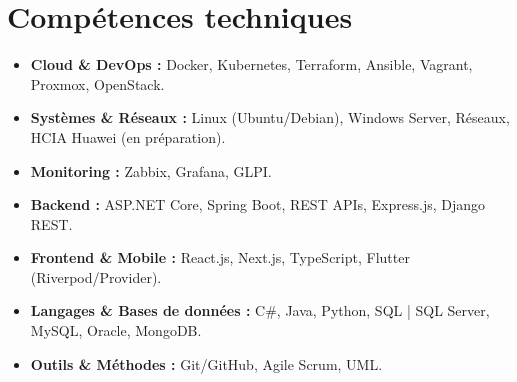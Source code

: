 \section{Compétences techniques}
    \vspace{0.2em}
    \begin{itemize}[label=\textbullet,left=0cm]
        \item \textbf{Cloud \& DevOps : }Docker, Kubernetes, Terraform, Ansible, Vagrant, Proxmox, OpenStack.
        \item \textbf{Systèmes \& Réseaux : }Linux (Ubuntu/Debian), Windows Server, Réseaux, HCIA Huawei (en préparation).
        \item \textbf{Monitoring : }Zabbix, Grafana, GLPI.
        \item \textbf{Backend : }ASP.NET Core, Spring Boot, REST APIs, Express.js, Django REST.
        \item \textbf{Frontend \& Mobile : }React.js, Next.js, TypeScript, Flutter (Riverpod/Provider).
        \item \textbf{Langages \& Bases de données : }C\#, Java, Python, SQL | SQL Server, MySQL, Oracle, MongoDB.
        \item \textbf{Outils \& Méthodes : }Git/GitHub, Agile Scrum, UML.
    \end{itemize}
